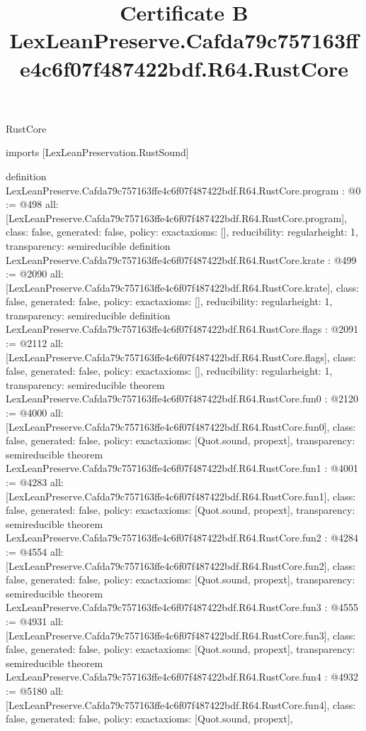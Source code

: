 \begin{lexlean}{RustCore}
\title{Certificate B LexLeanPreserve.Cafda79c757163ffe4c6f07f487422bdf.R64.RustCore}
\begin{coremodule}
imports [LexLeanPreservation.RustSound]

definition LexLeanPreserve.Cafda79c757163ffe4c6f07f487422bdf.R64.RustCore.program : @0 := @498 {
  all: [LexLeanPreserve.Cafda79c757163ffe4c6f07f487422bdf.R64.RustCore.program],
  class: false,
  generated: false,
  policy: exact{axioms: []},
  reducibility: regular{height: 1},
  transparency: semireducible
}
definition LexLeanPreserve.Cafda79c757163ffe4c6f07f487422bdf.R64.RustCore.krate : @499 := @2090 {
  all: [LexLeanPreserve.Cafda79c757163ffe4c6f07f487422bdf.R64.RustCore.krate],
  class: false,
  generated: false,
  policy: exact{axioms: []},
  reducibility: regular{height: 1},
  transparency: semireducible
}
definition LexLeanPreserve.Cafda79c757163ffe4c6f07f487422bdf.R64.RustCore.flags : @2091 := @2112 {
  all: [LexLeanPreserve.Cafda79c757163ffe4c6f07f487422bdf.R64.RustCore.flags],
  class: false,
  generated: false,
  policy: exact{axioms: []},
  reducibility: regular{height: 1},
  transparency: semireducible
}
theorem LexLeanPreserve.Cafda79c757163ffe4c6f07f487422bdf.R64.RustCore.fun0 : @2120 := @4000 {
  all: [LexLeanPreserve.Cafda79c757163ffe4c6f07f487422bdf.R64.RustCore.fun0],
  class: false,
  generated: false,
  policy: exact{axioms: [Quot.sound, propext]},
  transparency: semireducible
}
theorem LexLeanPreserve.Cafda79c757163ffe4c6f07f487422bdf.R64.RustCore.fun1 : @4001 := @4283 {
  all: [LexLeanPreserve.Cafda79c757163ffe4c6f07f487422bdf.R64.RustCore.fun1],
  class: false,
  generated: false,
  policy: exact{axioms: [Quot.sound, propext]},
  transparency: semireducible
}
theorem LexLeanPreserve.Cafda79c757163ffe4c6f07f487422bdf.R64.RustCore.fun2 : @4284 := @4554 {
  all: [LexLeanPreserve.Cafda79c757163ffe4c6f07f487422bdf.R64.RustCore.fun2],
  class: false,
  generated: false,
  policy: exact{axioms: [Quot.sound, propext]},
  transparency: semireducible
}
theorem LexLeanPreserve.Cafda79c757163ffe4c6f07f487422bdf.R64.RustCore.fun3 : @4555 := @4931 {
  all: [LexLeanPreserve.Cafda79c757163ffe4c6f07f487422bdf.R64.RustCore.fun3],
  class: false,
  generated: false,
  policy: exact{axioms: [Quot.sound, propext]},
  transparency: semireducible
}
theorem LexLeanPreserve.Cafda79c757163ffe4c6f07f487422bdf.R64.RustCore.fun4 : @4932 := @5180 {
  all: [LexLeanPreserve.Cafda79c757163ffe4c6f07f487422bdf.R64.RustCore.fun4],
  class: false,
  generated: false,
  policy: exact{axioms: [Quot.sound, propext]},
}
\end{coremodule}
\end{lexlean}
